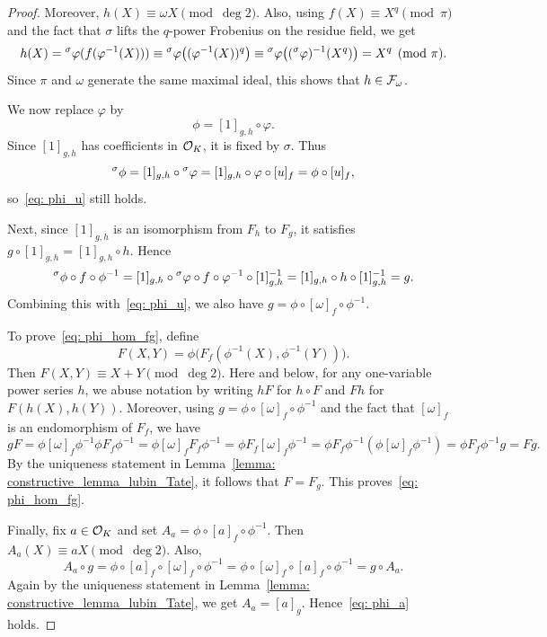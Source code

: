 \begin{proof}
    Moreover,
    $h(X)\equiv \omega X \pmod{\deg 2}$. Also, using
    $f(X)\equiv X^q \pmod{\pi}$ and the fact that $\sigma$ lifts the
    $q$-power Frobenius on the residue field, we get
    \[
        h(X)
        =
        {}^{\sigma}\varphi(f(\varphi^{-1}(X)))
        \equiv
        {}^{\sigma}\varphi\bigl((\varphi^{-1}(X))^q\bigr)
        \equiv
        {}^{\sigma}\varphi
        \bigl(({}^{\sigma}\varphi)^{-1}(X^q)\bigr)
        =
        X^q
        \pmod{\pi}.
    \]
    Since $\pi$ and $\omega$ generate the same maximal ideal, this shows that
    $h \in \mathcal{F}_\omega$.

    We now replace $\varphi$ by
    \[
        \phi=[1]_{g,h}\circ \varphi.
    \]
    Since $[1]_{g,h}$ has coefficients in $\mathcal{O}_K$, it is fixed by $\sigma$.
    Thus
    \[
        {}^{\sigma}\phi
        =
        [1]_{g,h}\circ {}^{\sigma}\varphi
        =
        [1]_{g,h}\circ \varphi\circ [u]_f
        =
        \phi\circ [u]_f,
    \]
    so~\eqref{eq: phi_u} still holds.

    Next, since $[1]_{g,h}$ is an isomorphism from $F_h$ to $F_g$, it satisfies
    $g\circ [1]_{g,h}=[1]_{g,h}\circ h$. Hence
    \[
        {}^{\sigma}\phi\circ f\circ \phi^{-1}
        =
        [1]_{g,h}\circ
        {}^{\sigma}\varphi\circ f\circ \varphi^{-1}
        \circ [1]_{g,h}^{-1}
        =
        [1]_{g,h}\circ h\circ [1]_{g,h}^{-1}
        =
        g.
    \]
    Combining this with~\eqref{eq: phi_u}, we also have
    $g=\phi\circ [\omega]_f\circ \phi^{-1}$.

    To prove~\eqref{eq: phi_hom_fg}, define
    \[
        F(X,Y)
        =
        \phi\bigl(F_f(\phi^{-1}(X),\phi^{-1}(Y))\bigr).
    \]
    Then $F(X,Y)\equiv X+Y \pmod{\deg 2}$.
    Here and below, for any one-variable power series $h$, we abuse notation by
writing $hF$ for $h\circ F$ and $Fh$ for $F(h(X),h(Y))$.
    Moreover, using
    $g=\phi\circ [\omega]_f\circ \phi^{-1}$ and the fact that $[\omega]_f$
    is an endomorphism of $F_f$, we have
    \[gF = \phi [\omega]_f \phi^{-1} \phi F_f \phi^{-1}
    = \phi [\omega]_f F_f \phi^{-1} =
    \phi F_f [\omega]_f \phi^{-1} = \phi F_f \phi^{-1} (\phi [\omega]_f \phi^{-1})
    = \phi F_f \phi^{-1} g= F g.
    \]
    By the uniqueness statement in Lemma~\ref{lemma: constructive_lemma_lubin_Tate},
    it follows that $F=F_g$. This proves~\eqref{eq: phi_hom_fg}.

    Finally, fix $a\in \mathcal{O}_K$ and set
    $A_a=\phi\circ [a]_f\circ \phi^{-1}$. Then
    $A_a(X)\equiv aX \pmod{\deg 2}$. Also,
    \[
        A_a\circ g
        =
        \phi\circ [a]_f\circ [\omega]_f\circ \phi^{-1}
        =
        \phi\circ [\omega]_f\circ [a]_f\circ \phi^{-1}
        =
        g\circ A_a.
    \]
    Again by the uniqueness statement in
    Lemma~\ref{lemma: constructive_lemma_lubin_Tate}, we get
    $A_a=[a]_g$. Hence~\eqref{eq: phi_a} holds.
\end{proof}

